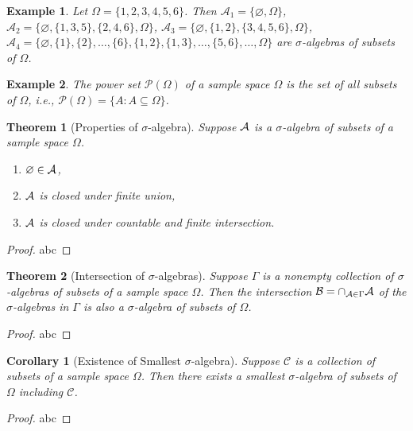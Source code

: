 \documentclass[openany,12pt]{book}
\newtheorem{theorem}{Theorem}[chapter]
\newtheorem{corollary}{Corollary}[chapter]
\newtheorem{example}{Example}[chapter]
\begin{document}
\begin{example}
  Let $\Omega=\{1,2,3,4,5,6\}$. Then $\mathcal{A}_1=\{\varnothing,\Omega\}$, $\mathcal{A}_2=\{\varnothing,\{1,3,5\},\{2,4,6\},\Omega\}$, $\mathcal{A}_3=\{\varnothing,\{1,2\},\{3,4,5,6\},\Omega\}$, $\mathcal{A}_4=\{\varnothing,\{1\},\{2\},\dots,\{6\},\{1,2\},\{1,3\},\dots,\{5,6\},\dots,\Omega\}$ are $\sigma$-algebras of subsets of $\Omega$.
\end{example}

\begin{example}
  The power set $\mathcal{P}(\Omega)$ of a sample space $\Omega$ is the set of all subsets of $\Omega$, i.e., $\mathcal{P}(\Omega)=\{A:A\subseteq\Omega\}$.
\end{example}

\begin{theorem}[Properties of $\sigma$-algebra]
  Suppose $\mathcal{A}$ is a $\sigma$-algebra of subsets of a sample space $\Omega$.
  \begin{enumerate}
    \item $\varnothing\in\mathcal{A}$,
    \item $\mathcal{A}$ is closed under finite union,
    \item $\mathcal{A}$ is closed under countable and finite intersection.
  \end{enumerate}
\end{theorem}

\begin{proof}
  abc
\end{proof}

\begin{theorem}[Intersection of $\sigma$-algebras]
  Suppose $\Gamma$ is a nonempty collection of $\sigma$-algebras of subsets of a sample space $\Omega$. Then the intersection $\mathcal{B}=\cap_{\mathcal{A}\in\Gamma}\mathcal{A}$ of the $\sigma$-algebras in $\Gamma$ is also a $\sigma$-algebra of subsets of $\Omega$.
\end{theorem}

\begin{proof}
  abc
\end{proof}

\begin{corollary}[Existence of Smallest $\sigma$-algebra]
  Suppose $\mathcal{C}$ is a collection of subsets of a sample space $\Omega$. Then there exists a smallest $\sigma$-algebra of subsets of $\Omega$ including $\mathcal{C}$.
\end{corollary}

\begin{proof}
  abc
\end{proof}
\end{document}
